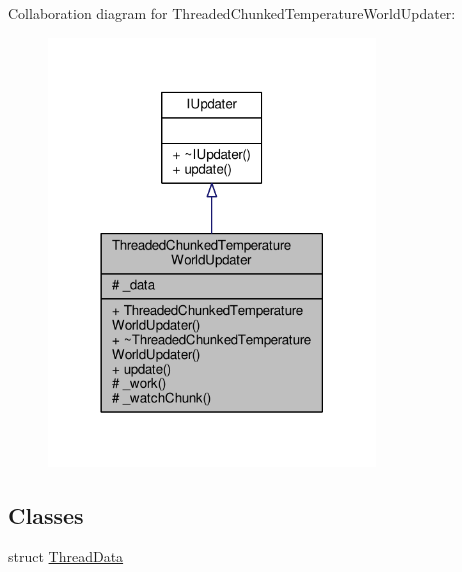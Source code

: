 Collaboration diagram for Threaded\-Chunked\-Temperature\-World\-Updater\-:
\nopagebreak
\begin{figure}[H]
\begin{center}
\leavevmode
\includegraphics[width=246pt]{class_threaded_chunked_temperature_world_updater__coll__graph}
\end{center}
\end{figure}
\subsection*{Classes}
\begin{DoxyCompactItemize}
\item 
struct \hyperlink{struct_threaded_chunked_temperature_world_updater_1_1_thread_data}{Thread\-Data}
\end{DoxyCompactItemize}
